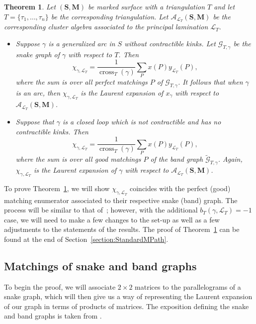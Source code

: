 \documentclass[10pt,a4paper]{amsart}
\numberwithin{equation}{section}
\newtheorem{Theorem}{Theorem}[section]
\theoremstyle{definition}
\newcommand{\SM}{(\mathbf{S}, \mathbf{M})}
\begin{document}
\begin{Theorem}\label{thm:matrixformulalamination}
 Let $\SM$ be marked surface with a triangulation $T$ and let $T=\{\tau_1,\ldots, \tau_n\}$ be the corresponding triangulation. Let $\mathcal{A}_{\mathcal{L}_T}\SM$ be the corresponding cluster algebra associated to the principal lamination $\mathcal{L}_T$.
 \begin{itemize}\itemsep=0pt
\item Suppose $\gamma$ is a generalized arc in $S$ without contractible kinks. Let $\mathcal{G}_{T,\gamma}$ be the snake graph of $\gamma$ with respect to $T$. Then \[
 \chi_{\gamma, \mathcal{L}_T}=\frac{1}{\operatorname{cross}_T(\gamma)}\sum_{P}x(P)y_{\mathcal{L}_T}(P),
 \]
where the sum is over all perfect matchings $P$ of $\mathcal{G}_{T,\gamma}$. It follows that when $\gamma$ is an arc, then $\chi_{\gamma, \mathcal{L}_T}$ is the Laurent expansion of $x_\gamma$ with respect to $\mathcal{A}_{\mathcal{L}_T}\SM$.
 \item Suppose that $\gamma$ is a closed loop which is not contractible and has no contractible kinks. Then
\[\chi_{\gamma, \mathcal{L}_T}=\frac{1}{\operatorname{cross}_T(\gamma)}\sum_{P}x(P)y_{\mathcal{L}_T}(P),\] where the sum is over all good matchings $P$ of the band graph $\widetilde{\mathcal{G}}_{T, \gamma}$. Again, $\chi_{\gamma, \mathcal{L}_T}$ is the Laurent expansion of $\gamma$ with respect to $\mathcal{A}_{\mathcal{L}_T}\SM$.
 \end{itemize}
\end{Theorem}

To prove Theorem~\ref{thm:matrixformulalamination}, we will show $\chi_{\gamma, \mathcal{L}_T}$ coincides with the perfect (good) matching enumerator associated to their respective snake (band) graph. The process will be similar to that of~\cite{MW13}; however, with the additional $b_T(\gamma, \mathcal{L}_T)=-1$ case, we will need to make a few changes to the set-up as well as a few adjustments to the statements of the results. The proof of Theorem~\ref{thm:matrixformulalamination} can be found at the end of Section~\ref{section:StandardMPath}.

\subsection{Matchings of snake and band graphs}

To begin the proof, we will associate $2\times 2$ matrices to the parallelograms of a snake graph, which will then give us a way of representing the Laurent expansion of our graph in terms of products of matrices. The exposition defining the snake and band graphs is taken from \cite{MW13}.
\end{document}
